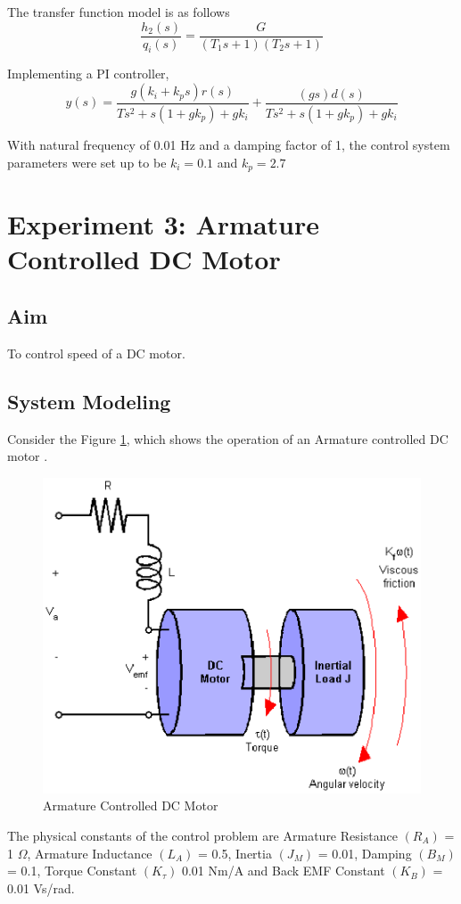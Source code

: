 The transfer function model is as follows
\[\frac{{{h_2}(s)}}{{{q_i}(s)}} = \frac{G}{{\left( {{T_1}s + 1} \right)\left( {{T_2}s + 1} \right)}}\]

Implementing a PI controller,
\[y(s) = \frac{{g({k_i} + {k_p}s)r(s)}}{{T{s^2} + s(1 + g{k_p}) + g{k_i}}} + \frac{{(gs)d(s)}}{{T{s^2} + s(1 + g{k_p}) + g{k_i}}}\]

With natural frequency of 0.01 Hz and a damping factor of 1, the control system parameters were set up to be $ {k_i}=0.1 $ and $ {k_p}=2.7 $


\section{Experiment 3: Armature Controlled DC Motor\cite{malla2012}}
\subsection{Aim}
To control speed of a DC motor.
\subsection{System Modeling}
Consider the Figure \ref{fig:ACDC_motor_01}, which shows the operation of an Armature controlled DC motor \cite{malla2012,MathworksInc.2014}.
\begin{figure}
\centering
\includegraphics[width=0.7\linewidth]{Appendix3/ACDC_motor_01}
\caption{Armature Controlled DC Motor}
\label{fig:ACDC_motor_01}
\end{figure}

The physical constants of the control problem are 
Armature Resistance $ (R_A) $ = 1 $\Omega $, 
Armature Inductance $ (L_A) $ = 0.5, 
Inertia $ (J_M) $ = 0.01, 
Damping $ (B_M) $ = 0.1, 
Torque Constant $ (K_{\tau}) $  0.01 Nm/A and 
Back EMF Constant $ (K_B) $ = 0.01 Vs/rad. 

